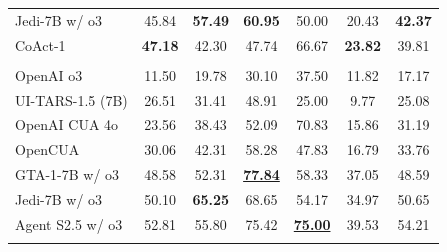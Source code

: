 \documentclass{article} %
\newcommand{\ours}{CoAct-1\xspace}
\newcommand{\best}[1]{\underline{#1}}
\begin{document}
\begin{table}[t]
{\begin{tabular}{lccccccccccc}
Jedi-7B w/ o3              & \multicolumn{3}{c}{45.84}           & \multicolumn{3}{c}{\textbf{57.49}} & \multicolumn{2}{c}{\textbf{60.95}}        & 50.00          & 20.43                  & \textbf{42.37}                    \\\rowcolor[HTML]{DBFCDA} 
\ours                    & \multicolumn{3}{c}{\textbf{47.18}}  & \multicolumn{3}{c}{42.30}          & \multicolumn{2}{c}{47.74}                 & 66.67 & \textbf{23.82}         & 39.81                             \\\rowcolor{gray!15}
\multicolumn{12}{c}{\textit{50 steps}}                                                                                                                                                                                                   \\
OpenAI o3                  & \multicolumn{3}{c}{11.50}           & \multicolumn{3}{c}{19.78}          & \multicolumn{2}{c}{30.10}                 & 37.50          & 11.82                  & 17.17                             \\
UI-TARS-1.5 (7B)             & \multicolumn{3}{c}{26.51}           & \multicolumn{3}{c}{31.41}          & \multicolumn{2}{c}{48.91}                 & 25.00          & 9.77                  & 25.08                            \\
OpenAI CUA 4o              & \multicolumn{3}{c}{23.56}           & \multicolumn{3}{c}{38.43}          & \multicolumn{2}{c}{52.09}                 & 70.83          & 15.86                  & 31.19                             \\
OpenCUA              & \multicolumn{3}{c}{30.06}           & \multicolumn{3}{c}{42.31}          & \multicolumn{2}{c}{58.28}                 & 47.83          & 16.79                  & 33.76                             \\
GTA-1-7B w/ o3             & \multicolumn{3}{c}{48.58}           & \multicolumn{3}{c}{52.31}          & \multicolumn{2}{c}{\textbf{\best{77.84}}}        & 58.33          & 37.05                  & 48.59                             \\
Jedi-7B w/ o3              & \multicolumn{3}{c}{50.10}           & \multicolumn{3}{c}{\textbf{65.25}}          & \multicolumn{2}{c}{68.65}                 & 54.17          & 34.97                  & 50.65                             \\
Agent S2.5 w/ o3           & \multicolumn{3}{c}{52.81}           & \multicolumn{3}{c}{55.80}          & \multicolumn{2}{c}{75.42}                 & \textbf{\best{75.00}} & 39.53                  & 54.21                             \\\rowcolor[HTML]{DBFCDA} 

\end{tabular}}
\end{table}
\end{document}
